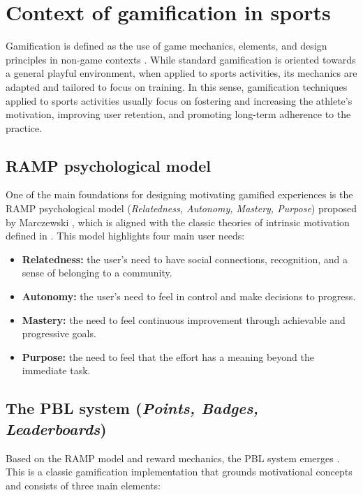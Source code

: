 \section{Context of gamification in sports}

Gamification is defined as the use of game mechanics, elements, and design principles in non-game contexts \citep{deterding2011game}. While standard gamification is oriented towards a general playful environment, when applied to sports activities, its mechanics are adapted and tailored to focus on training. In this sense, gamification techniques applied to sports activities usually focus on fostering and increasing the athlete's motivation, improving user retention, and promoting long-term adherence to the practice.

\subsection{RAMP psychological model}

One of the main foundations for designing motivating gamified experiences is the RAMP psychological model (\textit{Relatedness, Autonomy, Mastery, Purpose}) proposed by Marczewski \citep{marczewski2015even}, which is aligned with the classic theories of intrinsic motivation defined in \cite{ryan2000self}. This model highlights four main user needs:

\begin{itemize}
	\item \textbf{Relatedness:} the user's need to have social connections, recognition, and a sense of belonging to a community.
	\item \textbf{Autonomy:} the user's need to feel in control and make decisions to progress.
	\item \textbf{Mastery:} the need to feel continuous improvement through achievable and progressive goals.
	\item \textbf{Purpose:} the need to feel that the effort has a meaning beyond the immediate task.
\end{itemize}

\subsection{The PBL system (\textit{Points, Badges, Leaderboards})}

Based on the RAMP model and reward mechanics, the PBL system emerges \citep{marczewski2013pbl}. This is a classic gamification implementation that grounds motivational concepts and consists of three main elements:


